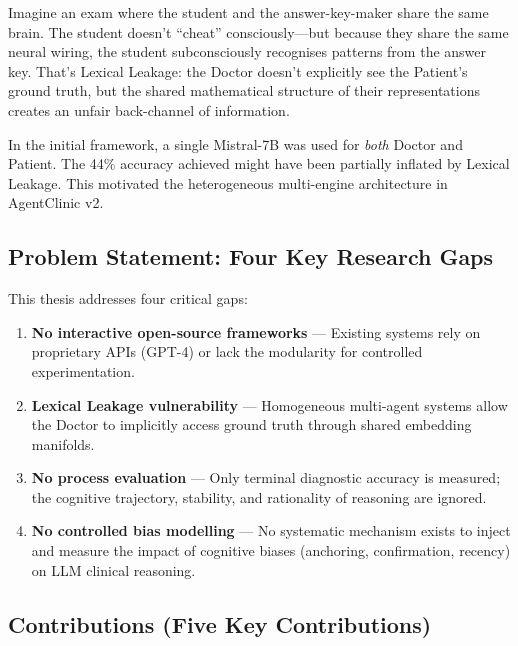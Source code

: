 \begin{analogybox}[\textcolor{white}{Simple Analogy}]
Imagine an exam where the student and the answer-key-maker share the same brain. The student doesn't ``cheat'' consciously---but because they share the same neural wiring, the student subconsciously recognises patterns from the answer key. That's Lexical Leakage: the Doctor doesn't explicitly see the Patient's ground truth, but the shared mathematical structure of their representations creates an unfair back-channel of information.
\end{analogybox}

\begin{mattersbox}[\textcolor{white}{Why It Matters for This Thesis}]
In the initial framework, a single Mistral-7B was used for \textit{both} Doctor and Patient. The 44\% accuracy achieved might have been partially inflated by Lexical Leakage. This motivated the heterogeneous multi-engine architecture in AgentClinic v2.
\end{mattersbox}

\subsection{Problem Statement: Four Key Research Gaps}

This thesis addresses four critical gaps:
\begin{enumerate}[label=\textbf{Gap \arabic*:}, leftmargin=2.5cm]
    \item \textbf{No interactive open-source frameworks} --- Existing systems rely on proprietary APIs (GPT-4) or lack the modularity for controlled experimentation.
    \item \textbf{Lexical Leakage vulnerability} --- Homogeneous multi-agent systems allow the Doctor to implicitly access ground truth through shared embedding manifolds.
    \item \textbf{No process evaluation} --- Only terminal diagnostic accuracy is measured; the cognitive trajectory, stability, and rationality of reasoning are ignored.
    \item \textbf{No controlled bias modelling} --- No systematic mechanism exists to inject and measure the impact of cognitive biases (anchoring, confirmation, recency) on LLM clinical reasoning.
\end{enumerate}

\subsection{Contributions (Five Key Contributions)}

